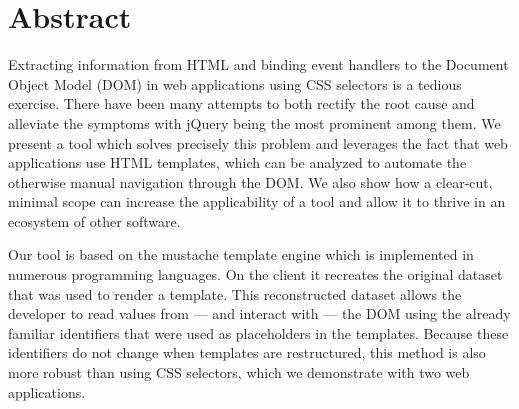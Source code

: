 \documentclass[thesis.tex]{subfiles}
\begin{document}
\chapter*{Abstract}
\label{chap:abstract}

Extracting information from HTML and binding event handlers to the
Document Object Model (DOM) in web applications using CSS selectors is a tedious
exercise.
There have been many attempts to both rectify the root cause and
alleviate the symptoms with jQuery being the most prominent among them.
We present a tool which solves precisely this problem and leverages the fact
that web applications use HTML templates,
which can be analyzed to automate the otherwise manual navigation through
the DOM.
We also show how a clear-cut, minimal scope can increase the applicability of
a tool and allow it to thrive in an ecosystem of other software.

Our tool is based on the mustache template engine which is implemented in
numerous programming languages.
On the client it recreates the original dataset that was used to render a
template.
This reconstructed dataset allows the developer to read values from
--- and interact with --- the DOM using the already familiar identifiers that
were used as placeholders in the templates.
Because these identifiers do not change when templates are restructured,
this method is also more robust than using CSS selectors,
which we demonstrate with two web applications.
\end{document}
